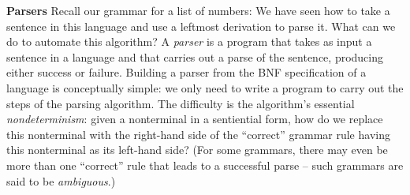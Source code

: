 \begin{minipage}[t]{\sw}
\slidenumber
\LARGE
{\bf Parsers}\exx
Recall our grammar for a list of numbers:\exx
\emm{\Large\LightBox{\MYlon}}\exx
We have seen how to take a sentence in this language
and use a leftmost derivation to parse it.
What can we do to automate this algorithm?\exx
A {\em parser} is a program
that takes as input a sentence in a language
and that carries out a parse of the sentence,
producing either success or failure.
Building a parser from the BNF specification of a language
is conceptually simple:
we only need to write a program
to carry out the steps of the parsing algorithm.
The difficulty is the algorithm's essential {\em nondeterminism}:
given a nonterminal in a sentiential form,
how do we replace this nonterminal with the right-hand side
of the ``correct'' grammar rule
having this nonterminal as its left-hand side?
(For some grammars, there may even be more than one ``correct'' rule
that leads to a successful parse --
such grammars are said to be {\em ambiguous}.)\exx
\end{minipage}
\clearpage
